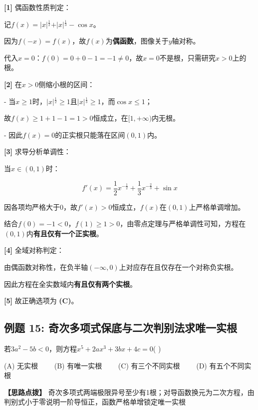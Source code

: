 \documentclass[11pt,a4paper,UTF8]{ctexart}
\begin{document}
\begin{solbox}[分步推导与答题规范]
\textbf{[1]} 偶函数性质判定：

记$f(x) = \vert{}x\vert{}^{\frac{1}{2}} + \vert{}x\vert{}^{\frac{1}{3}} - \cos x$。

因为$f(-x) = f(x)$，故$f(x)$为\textbf{偶函数}，图像关于$y$轴对称。

代入$x = 0$：$f(0) = 0 + 0 - 1 = -1 \neq 0$，故$x = 0$不是根，只需研究$x > 0$上的根。

\textbf{[2]} 在$x > 0$侧缩小根的区间：

- 当$x \ge 1$时，$\vert{}x\vert{}^{\frac{1}{2}} \ge 1$且$\vert{}x\vert{}^{\frac{1}{3}} \ge 1$，而$\cos x \le 1$；

 故$f(x) \ge 1 + 1 - 1 = 1 > 0$恒成立，在$[1, +\infty)$内无根。

- 因此$f(x) = 0$的正实根只能落在区间$(0, 1)$内。

\textbf{[3]} 求导分析单调性：

当$x \in (0, 1)$时：


\begin{equation*}
f'(x) = \frac{1}{2}x^{-\frac{1}{2}} + \frac{1}{3}x^{-\frac{2}{3}} + \sin x
\end{equation*}


因各项均严格大于0，故$f'(x) > 0$恒成立，$f(x)$在$(0, 1)$上严格单调增加。

结合$f(0) = -1 < 0$，$f(1) \ge 1 > 0$，由零点定理与严格单调性可知，方程在$(0, 1)$内\textbf{有且仅有一个正实根}。

\textbf{[4]} 全域对称判定：

由偶函数对称性，在负半轴$(-\infty, 0)$上对应存在且仅存在一个对称负实根。

因此方程在全实数域内\textbf{有且仅有两个实根}。

\textbf{[5]} 故正确选项为 \textbf{(C)}。
\end{solbox}


\subsection{例题 15: 奇次多项式保底与二次判别法求唯一实根}

若$3a^2 - 5b < 0$，则方程$x^5 + 2ax^3 + 3bx + 4c = 0$( )

(A) 无实根 $\qquad$(B) 有唯一实根 $\qquad$(C) 有三个不同实根 $\qquad$(D) 有五个不同实根

\textbf{\color{DeepPurple}【思路点拨】} 奇次多项式两端极限异号至少有1根；对导函数换元为二次方程，由判别式小于零说明一阶导恒正，函数严格单增锁定唯一实根
\end{document}

